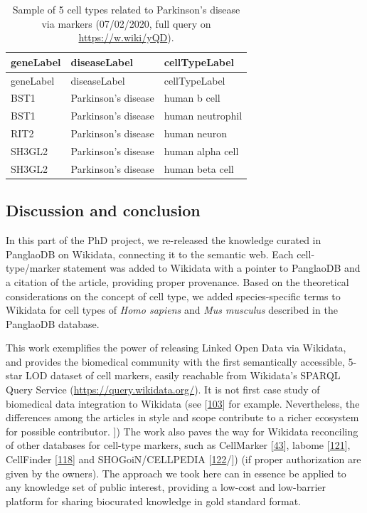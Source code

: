 \begin{longtable}[]{@{}lll@{}}
\caption{Sample of 5 cell types related to Parkinson's disease via markers (07/02/2020, full query on \url{https://w.wiki/yQD}).
\label{tbl:parkinson}}\tabularnewline
\toprule
geneLabel & diseaseLabel & cellTypeLabel \\
\midrule
\endfirsthead
\toprule
geneLabel & diseaseLabel & cellTypeLabel \\
\midrule
\endhead
BST1 & Parkinson's disease & human b cell \\
BST1 & Parkinson's disease & human neutrophil \\
RIT2 & Parkinson's disease & human neuron \\
SH3GL2 & Parkinson's disease & human alpha cell \\
SH3GL2 & Parkinson's disease & human beta cell \\
\bottomrule
\end{longtable}

\hypertarget{discussion-and-conclusion}{%
\subsection{Discussion and conclusion}\label{discussion-and-conclusion}}

In this part of the PhD project, we re-released the knowledge curated in PanglaoDB on Wikidata, connecting it to the semantic web.
Each cell-type/marker statement was added to Wikidata with a pointer to PanglaoDB and a citation of the article, providing proper provenance.
Based on the theoretical considerations on the concept of cell type, we added species-specific terms to Wikidata for cell types of \emph{Homo sapiens} and \emph{Mus musculus} described in the PanglaoDB database.

This work exemplifies the power of releasing Linked Open Data via Wikidata, and provides the biomedical community with the first semantically accessible, 5-star LOD dataset of cell markers, easily reachable from Wikidata's SPARQL Query Service (\url{https://query.wikidata.org/}).
It is not first case study of biomedical data integration to Wikidata (see {[}\protect\hyperlink{ref-mPoPwN77}{103}{]} for example.
Nevertheless, the differences among the articles in style and scope contribute to a richer ecosystem for possible contributor.
{]})
The work also paves the way for Wikidata reconciling of other databases for cell-type markers, such as CellMarker {[}\protect\hyperlink{ref-chGii6yw}{43}{]}, labome {[}\protect\hyperlink{ref-rhRRCtlA}{121}{]}, CellFinder {[}\protect\hyperlink{ref-4AEy2xhQ}{118}{]} and SHOGoiN/CELLPEDIA {[}\protect\hyperlink{ref-6uWWsiSq}{122}/{]}) (if proper authorization are given by the owners).
The approach we took here can in essence be applied to any knowledge set of public interest, providing a low-cost and low-barrier platform for sharing biocurated knowledge in gold standard format.

